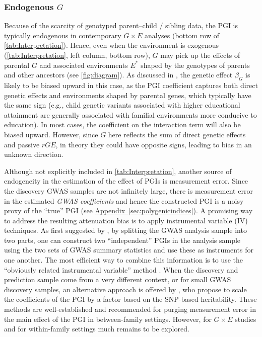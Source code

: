 \documentclass[12pt,a4paper]{article}
\begin{document}
\begin{bibunit}
\subsubsection{Endogenous \texorpdfstring{$G$}{}} \label{subsec:endogenousG}
Because of the scarcity of genotyped parent--child / sibling data, the PGI is typically endogenous in contemporary $G \times E$ analyses (bottom row of \autoref{tab:Interpretation}). Hence, even when the environment is exogenous (\autoref{tab:Interpretation}, left column, bottom row), $G$ may pick up the effects of parental $G$ and associated environments $E^*$ shaped by the genotypes of parents and other ancestors (see \autoref{fig:diagram}). As discussed in \cite{Trejo2019}, the genetic effect $\beta_{G}$ is likely to be biased upward in this case, as the PGI coefficient captures both direct genetic effects and environments shaped by parental genes, which typically have the same sign (e.g., child genetic variants associated with higher educational attainment are generally associated with familial environments more conducive to education). In most cases, the coefficient on the interaction term will also be biased upward. However, since $G$ here reflects the sum of direct genetic effects and passive $rGE$, in theory they could have opposite signs, leading to bias in an unknown direction.

Although not explicitly included in \autoref{tab:Interpretation}, another source of endogeneity in the estimation of the effect of PGIs is measurement error. Since the discovery GWAS samples are not infinitely large, there is measurement error in the estimated \textit{GWAS coefficients} and hence the constructed PGI is a noisy proxy of the ``true'' PGI (see \hyperref[sec:polygenicindices]{Appendix~\ref*{sec:polygenicindices}}). A promising way to address the resulting attenuation bias is to apply instrumental variable (IV) techniques. As first suggested by \citet{DiPrete2018}, by splitting the GWAS analysis sample into two parts, one can construct two ``independent'' PGIs in the analysis sample using the two sets of GWAS summary statistics and use these as instruments for one another. The most efficient way to combine this information is to use the ``obviously related instrumental variable'' method \citep{gillen2019experimenting,VanKippersluis2020}. When the discovery and prediction sample come from a very different context, or for small GWAS discovery samples, an alternative approach is offered by \citet{Becker2021}, who propose to scale the coefficients of the PGI by a factor based on the SNP-based heritability. These methods are well-established and recommended for purging measurement error in the main effect of the PGI in between-family settings. However, for $G \times E$ studies and for within-family settings much remains to be explored. 


\end{bibunit}
\end{document}
